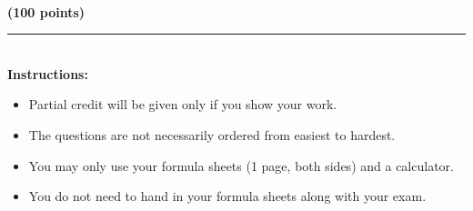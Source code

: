 \documentclass[12pt]{article}
\begin{document}
\begin{center}
  \textbf{\large \semester{}} \hfill \textbf{\large \class{}} \hfill \textbf{\large \exam{}}\\
  \hfill \textbf{(100 points)}
\end{center}

\vspace*{1in}

 \rule{5in}{.01in}\\[1in]

\textbf{Instructions:}\\
\begin{itemize}
\item {\large Partial credit will be given only if you show your work.}
\item {\large The questions are not necessarily ordered from easiest to hardest.}
\item {\large You may only use your formula sheets (1 page, both sides) and a calculator.}
\item {\large You do not need to hand in your formula sheets along with your exam.}
\end{itemize}
\end{document}
